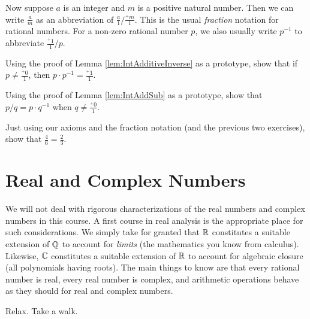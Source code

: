 Now suppose $a$ is an integer and $m$ is a positive natural number. Then we
can write $\frac{a}m$ as an abbreviation of $\frac{a}{1} / \frac{{}^+m}1$. This is
the usual \emph{fraction} notation for rational numbers.
For a non-zero rational number $p$, we also usually write $p^{-1}$ to abbreviate 
$\frac{{}^+1}{1}/ p$.

\begin{exer}
\begin{exercise}
\item Using the proof of Lemma \ref{lem:IntAdditiveInverse} as a prototype, show that if $p\neq \frac{{}^+0}{1}$,
then $p\cdot p^{-1} = \frac{{}^+1}{1}$. 
\item Using the proof of Lemma \ref{lem:IntAddSub} as a prototype, show that $p/ q = p\cdot q^{-1}$
when $q\neq \frac{{}^+0}{1}$.
\item Just using our axioms and the fraction notation (and the previous two exercises),
show that $\frac{4}{6} = \frac{2}{3}$.
\end{exercise}
\end{exer}

\section{Real and Complex Numbers}

We will not deal with rigorous characterizations of the real numbers and complex numbers in this course. 
A first course in real analysis is the appropriate place for such considerations. 
We simply take for granted that ${\mathbb R}$ constitutes a suitable
extension of ${\mathbb Q}$ to account for \emph{limits} (the mathematics you know from calculus). Likewise, ${\mathbb C}$
constitutes a suitable extension of ${\mathbb R}$ to account for 
algebraic closure (all polynomials having roots). The main things to know are that every rational number is real,
every real number is complex, and arithmetic operations behave as they should for real and complex numbers.

\begin{exer}
\begin{exercise}
  \item Relax. Take a walk.
\end{exercise}
\end{exer}